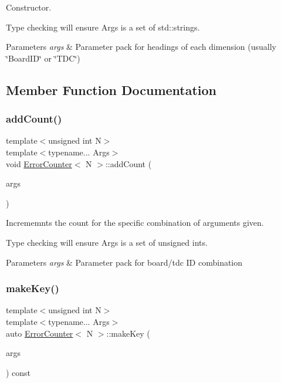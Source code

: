 Constructor. 

Type checking will ensure Args is a set of std\+::strings. 
\begin{DoxyParams}{Parameters}
{\em args} & Parameter pack for headings of each dimension (usually \char`\"{}\+Board\+I\+D\char`\"{} or \char`\"{}\+T\+D\+C\char`\"{}) \\
\hline
\end{DoxyParams}


\subsection{Member Function Documentation}
\mbox{\label{class_error_counter_a6d2fdf410a8860c744f0f9806ec8ce1d}} 
\subsubsection{\texorpdfstring{add\+Count()}{addCount()}}
{\footnotesize\ttfamily template$<$unsigned int N$>$ \\
template$<$typename... Args$>$ \\
void \hyperlink{class_error_counter}{Error\+Counter}$<$ N $>$\+::add\+Count (\begin{DoxyParamCaption}\item[{Args...}]{args }\end{DoxyParamCaption})}



Incrememnts the count for the specific combination of arguments given. 

Type checking will ensure Args is a set of unsigned ints. 
\begin{DoxyParams}{Parameters}
{\em args} & Parameter pack for board/tdc ID combination \\
\hline
\end{DoxyParams}
\mbox{\label{class_error_counter_ace87ff9ca25693815b683f7e28349e95}} 
\subsubsection{\texorpdfstring{make\+Key()}{makeKey()}}
{\footnotesize\ttfamily template$<$unsigned int N$>$ \\
template$<$typename... Args$>$ \\
auto \hyperlink{class_error_counter}{Error\+Counter}$<$ N $>$\+::make\+Key (\begin{DoxyParamCaption}\item[{Args...}]{args }\end{DoxyParamCaption}) const\hspace{0.3cm}{\ttfamily [private]}}



